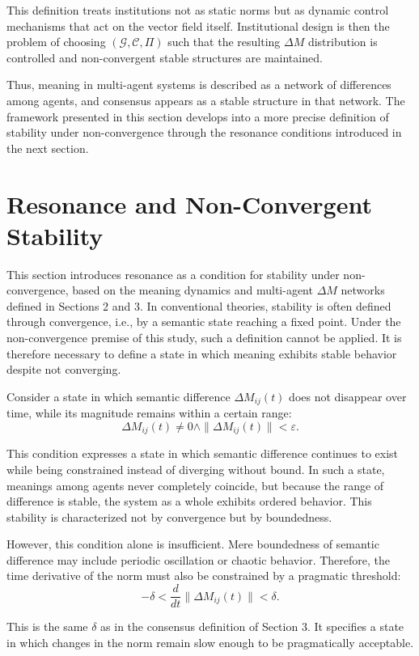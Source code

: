 \documentclass[11pt,a4paper]{article}
\theoremstyle{definition}
\begin{document}
This definition treats institutions not as static norms but as dynamic control mechanisms that act on the vector field itself. Institutional design is then the problem of choosing $(\mathcal{G}, \mathcal{C}, \Pi)$ such that the resulting $\Delta M$ distribution is controlled and non-convergent stable structures are maintained.

Thus, meaning in multi-agent systems is described as a network of differences among agents, and consensus appears as a stable structure in that network. The framework presented in this section develops into a more precise definition of stability under non-convergence through the resonance conditions introduced in the next section.

\section{Resonance and Non-Convergent Stability}

This section introduces resonance as a condition for stability under non-convergence, based on the meaning dynamics and multi-agent $\Delta M$ networks defined in Sections 2 and 3. In conventional theories, stability is often defined through convergence, i.e., by a semantic state reaching a fixed point. Under the non-convergence premise of this study, such a definition cannot be applied. It is therefore necessary to define a state in which meaning exhibits stable behavior despite not converging.

Consider a state in which semantic difference $\Delta M_{ij}(t)$ does not disappear over time, while its magnitude remains within a certain range:
\[
\Delta M_{ij}(t) \neq 0 \land \|\Delta M_{ij}(t)\| < \varepsilon.
\]

This condition expresses a state in which semantic difference continues to exist while being constrained instead of diverging without bound. In such a state, meanings among agents never completely coincide, but because the range of difference is stable, the system as a whole exhibits ordered behavior. This stability is characterized not by convergence but by boundedness.

However, this condition alone is insufficient. Mere boundedness of semantic difference may include periodic oscillation or chaotic behavior. Therefore, the time derivative of the norm must also be constrained by a pragmatic threshold:
\[
-\delta < \frac{d}{dt}\|\Delta M_{ij}(t)\| < \delta.
\]

This is the same $\delta$ as in the consensus definition of Section 3. It specifies a state in which changes in the norm remain slow enough to be pragmatically acceptable.
\end{document}
